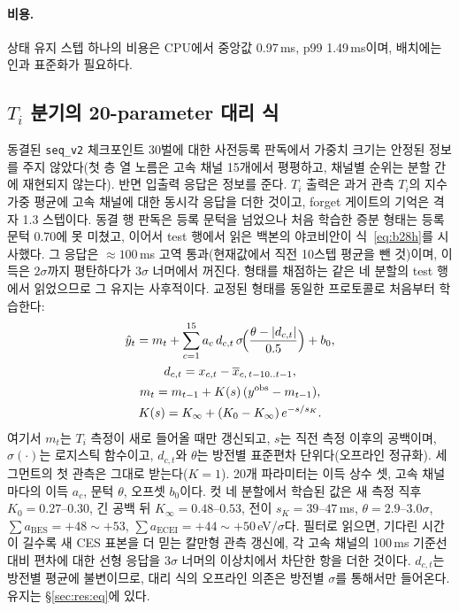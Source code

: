 \documentclass[10pt,twocolumn,letterpaper]{article}
\newcommand{\Ti}{\ensuremath{T_i}}
\newcommand{\seqv}{\texttt{seq\_v2}}
\begin{document}
\paragraph{비용.} 상태 유지 스텝 하나의 비용은 CPU에서 중앙값 0.97\,ms, p99 1.49\,ms이며, 배치에는 인과 표준화가 필요하다.

\subsection{\texorpdfstring{\Ti{} 분기의 20-parameter 대리 식}{Ti 분기의 20-parameter 대리 식}}
\label{sec:model:eq}
동결된 \seqv{} 체크포인트 30벌에 대한 사전등록 판독에서 가중치 크기는 안정된 정보를
주지 않았다(첫 층 열 노름은 고속 채널 15개에서 평평하고, 채널별 순위는 분할 간에
재현되지 않는다). 반면 입출력 응답은 정보를 준다. \Ti{} 출력은 과거 관측 \Ti{}의 지수가중
평균에 고속 채널에 대한 동시각 응답을 더한 것이고, forget 게이트의 기억은 격자 1.3
스텝이다. 동결 행 판독은 등록 문턱을 넘었으나 처음 학습한 증분 형태는 등록 문턱 0.70에 못 미쳤고, 이어서 test
행에서 읽은 백본의 야코비안이 식~\eqref{eq:b28h}를 시사했다. 그 응답은 ${\approx}100$\,ms
고역 통과(현재값에서 직전 10스텝 평균을 뺀 것)이며, 이득은 $2\sigma$까지 평탄하다가
$3\sigma$ 너머에서 꺼진다. 형태를 채점하는 같은 네 분할의 test 행에서 읽었으므로 그 유지는
사후적이다. 교정된 형태를 동일한 프로토콜로 처음부터 학습한다:
\begin{gather}
  \hat y_t = m_t + \sum_{c=1}^{15} a_c\, d_{c,t}\,
     \sigma\!\Bigl(\frac{\theta-|d_{c,t}|}{0.5}\Bigr) + b_0,
  \label{eq:b28h}\\
  d_{c,t} = x_{c,t} - \overline{x}_{c,\,t-10..t-1},
  \nonumber\\
  m_t = m_{t-1} + K(s)\,(y^\mathrm{obs} - m_{t-1}),
  \nonumber\\
  K(s) = K_\infty + (K_0 - K_\infty)\,e^{-s/s_K}.
  \label{eq:gain}
\end{gather}
여기서 $m_t$는 \Ti{} 측정이 새로 들어올 때만 갱신되고, $s$는 직전 측정 이후의 공백이며,
$\sigma(\cdot)$는 로지스틱 함수이고, $d_{c,t}$와 $\theta$는 방전별 표준편차 단위다(오프라인
정규화). 세그먼트의 첫 관측은 그대로 받는다($K=1$). 20개 파라미터는 이득 상수 셋, 고속
채널마다의 이득 $a_c$, 문턱 $\theta$, 오프셋 $b_0$이다. 컷 네 분할에서 학습된 값은 새 측정
직후 $K_0 = 0.27$--$0.30$, 긴 공백 뒤 $K_\infty = 0.48$--$0.53$, 전이 $s_K = 39$--$47$\,ms,
$\theta = 2.9$--$3.0\sigma$, $\sum a_{\mathrm{BES}} = +48\sim+53$,
$\sum a_{\mathrm{ECEI}} = +44\sim+50$\,eV/$\sigma$다. 필터로 읽으면, 기다린 시간이 길수록 새
CES 표본을 더 믿는 칼만형 관측 갱신에, 각 고속 채널의 100\,ms 기준선 대비 편차에 대한 선형
응답을 $3\sigma$ 너머의 이상치에서 차단한 항을 더한 것이다. $d_{c,t}$는 방전별 평균에
불변이므로, 대리 식의 오프라인 의존은 방전별 $\sigma$를 통해서만 들어온다. 유지는
\S\ref{sec:res:eq}에 있다.
\end{document}

